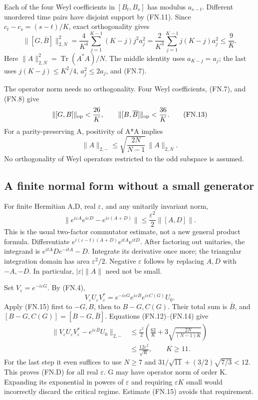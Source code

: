 Each of the four Weyl coefficients in \([B_t,B_s]\) has modulus \(a_{s-t}\). Different unordered time pairs have disjoint support by (FN.11). Since \(c_t-c_s=(s-t)/K\), exact orthogonality gives \[
 \|[G,\overline B]\|_{2,N}^2
 =\frac4{K^4}\sum_{j=1}^{K-1}(K-j)j^2a_j^2
 =\frac2{K^3}\sum_{j=1}^{K-1}j(K-j)a_j^2
 \leq\frac9K.                                                  \tag{FN.12}
\] Here \(\|A\|_{2,N}^2=\operatorname{Tr}(A^*A)/N\). The middle identity uses \(a_{K-j}=a_j\); the last uses \(j(K-j)\leq K^2/4\), \(a_j^2\leq2a_j\), and (FN.7).

The operator norm needs no orthogonality. Four Weyl coefficients, (FN.7), and (FN.8) give \[
 \|[G,B]\|_{\rm op}<\frac{26}{K},\qquad
 \|[B,\overline B]\|_{\rm op}<\frac{36}{K}.                     \tag{FN.13}
\] For a parity-preserving A, positivity of A*A implies \[
 \|A\|_{2,-}\leq\sqrt{\frac{2N}{N-1}}\,\|A\|_{2,N}.             \tag{FN.14}
\] No orthogonality of Weyl operators restricted to the odd subspace is assumed.

\subsection{A finite normal form without a small generator}\label{floquet:a-finite-normal-form-without-a-small-generator}

For finite Hermitian A,D, real \(\varepsilon\), and any unitarily invariant norm, \[
 \|e^{i\varepsilon A}e^{i\varepsilon D}
           -e^{i\varepsilon(A+D)}\|
 \leq\frac{\varepsilon^2}{2}\|[A,D]\|.                          \tag{FN.15}
\] This is the usual two-factor commutator estimate, not a new general product formula. Differentiate \(e^{i(\varepsilon-t)(A+D)}e^{itA}e^{itD}\). After factoring out unitaries, the integrand is \(e^{itA}De^{-itA}-D\). Integrate its derivative once more; the triangular integration domain has area \(\varepsilon^2/2\). Negative \(\varepsilon\) follows by replacing \(A,D\) with \(-A,-D\). In particular, \(|\varepsilon|\|A\|\) need not be small.

Set \(V_\varepsilon=e^{-i\varepsilon G}\). By (FN.4), \[
 V_\varepsilon U_\varepsilon V_\varepsilon^*
 =e^{-i\varepsilon G}e^{i\varepsilon B}
       e^{i\varepsilon C(G)}U_0.
\] Apply (FN.15) first to \(-G,B\), then to \(B-G,C(G)\). Their total sum is \(\bar B\), and \([B-G,C(G)]=[B-G,\bar B]\). Equations (FN.12)--(FN.14) give \[
 \begin{split}
 \|V_\varepsilon U_\varepsilon V_\varepsilon^*
       -e^{i\varepsilon\overline B}U_0\|_{2,-}
 &\leq\frac{\varepsilon^2}{2}
   \left(\frac{62}{K}+3\sqrt{\frac{2N}{(N-1)K}}\right)\\
 &\leq\frac{12\varepsilon^2}{\sqrt K},\qquad K\geq11.
 \end{split}\tag{FN.16}
\] For the last step it even suffices to use \(N\geq7\) and \(31/\sqrt{11}+(3/2)\sqrt{7/3}<12\). This proves (FN.D) for all real \(\varepsilon\). G may have operator norm of order K. Expanding its exponential in powers of \(\varepsilon\) and requiring \(\varepsilon K\) small would incorrectly discard the critical regime. Estimate (FN.15) avoids that requirement.

